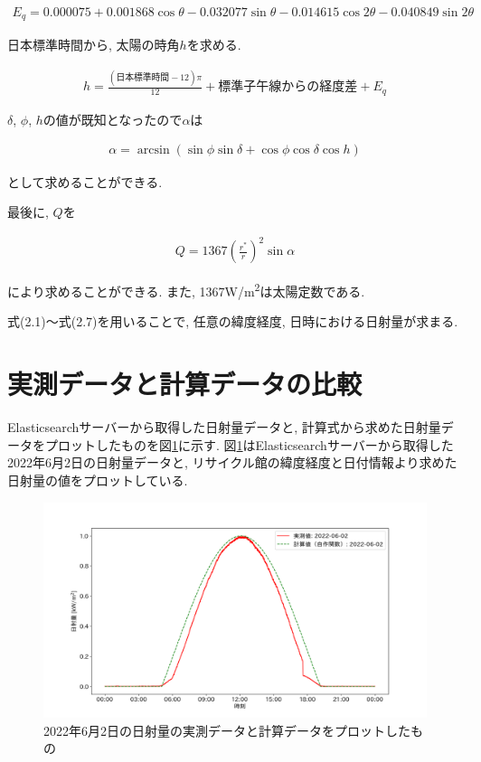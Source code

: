 \begin{eqnarray}
  E_q =  0.000075+0.001868\cos \theta-0.032077\sin \theta-0.014615\cos 2\theta-0.040849\sin 2\theta
\end{eqnarray}

日本標準時間から, 太陽の時角$h$を求める.

\begin{eqnarray}
  h = \frac{(日本標準時間-12)\pi}{12}+標準子午線からの経度差+E_q
\end{eqnarray}

$\delta$, $\phi$, $h$の値が既知となったので$\alpha$は

\begin{eqnarray}
  \alpha = \arcsin (\sin \phi\sin \delta+\cos \phi\cos \delta\cos h)
\end{eqnarray}

として求めることができる.

最後に, $Q$を

\begin{eqnarray}
  Q = 1367(\frac{r^{*}}{r})^{2}\sin \alpha
\end{eqnarray}

により求めることができる.
また, 1367\si{\watt}/\si{\metre\squared}は太陽定数である.

式(2.1)～式(2.7)を用いることで, 任意の緯度経度, 日時における日射量が求まる.


\section{実測データと計算データの比較}
Elasticsearchサーバーから取得した日射量データと, 計算式から求めた日射量データをプロットしたものを図\ref{20220529-p1}に示す.
図\ref{20220529-p1}はElasticsearchサーバーから取得した2022年6月2日の日射量データと, リサイクル館の緯度経度と日付情報より求めた日射量の値をプロットしている.

\begin{figure}[h]
  \begin{center}
    \includegraphics[width=160mm]{sotu/figure/2/original-20220602-corr.png}
    \caption{2022年6月2日の日射量の実測データと計算データをプロットしたもの}
    \label{20220529-p1}
  \end{center}
\end{figure}

